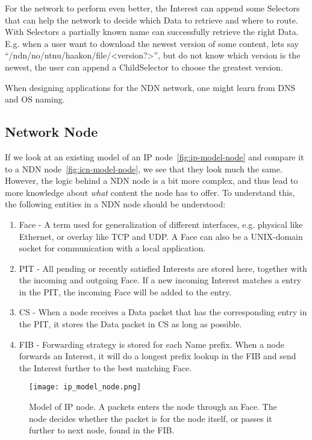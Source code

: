 For the network to perform even better, the Interest can append some Selectors that can help the network to decide which Data to retrieve and where to route.
With Selectors a partially known name can successfully retrieve the right Data.
E.g. when a user want to download the newest version of some content, lets say ``/ndn/no/ntnu/haakon/file/<version?>'', but do not know which version is the newest, the user can append a ChildSelector to choose the greatest version.

When designing applications for the \gls{NDN} network, one might learn from \gls{DNS} and \gls{OS} naming.

\subsection{Network Node}
If we look at an existing model of an \gls{IP} node~\autoref{fig:ip-model-node} and compare it to a \gls{NDN} node~\autoref{fig:icn-model-node}, we see that they look much the same.
However, the logic behind a \gls{NDN} node is a bit more complex, and thus lead to more knowledge about \textit{what} content the node has to offer.
To understand this, the following entities in a \gls{NDN} node should be understood:
\begin{enumerate}\label{ndn-node-modules}
  \item Face - A term used for generalization of different interfaces, e.g. physical like Ethernet, or overlay like \gls{TCP} and \gls{UDP}. A Face can also be a UNIX-domain socket for communication with a local application.
  \item \gls{PIT} - All pending or recently satisfied Interests are stored here, together with the incoming and outgoing Face.
  If a new incoming Interest matches a entry in the \gls{PIT}, the incoming Face will be added to the entry. 
  \item \gls{CS} - When a node receives a Data packet that has the corresponding entry in the \gls{PIT}, it stores the Data packet in \gls{CS} as long as possible. 
  \item \gls{FIB} - Forwarding strategy is stored for each Name prefix. 
  When a node forwards an Interest, it will do a longest prefix lookup in the \gls{FIB} and send the Interest further to the best matching Face.
\end{enumerate}

\begin{figure}[H]
  \centering
  \texttt{[image: ip\_model\_node.png]}
  \caption{Model of IP node. A packets enters the node through an Face. 
  The node decides whether the packet is for the node itself, or passes it further to next node, found in the FIB.}
  \label{fig:ip-model-node}
\end{figure}

